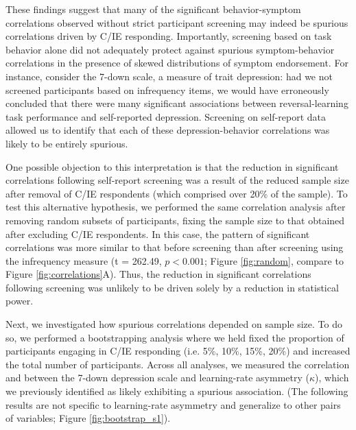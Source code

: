 \documentclass[a4paper,notitlepage,12pt]{article}
\begin{document}
\begin{refsection}[main]
These findings suggest that many of the significant behavior-symptom correlations observed without strict participant screening may indeed be spurious correlations driven by C/IE responding. Importantly, screening based on task behavior alone did not adequately protect against spurious symptom-behavior correlations in the presence of skewed distributions of symptom endorsement. For instance, consider the 7-down scale, a measure of trait depression: had we not screened participants based on infrequency items, we would have erroneously concluded that there were many significant associations between reversal-learning task performance and self-reported depression. Screening on self-report data allowed us to identify that each of these depression-behavior correlations was likely to be entirely spurious.

One possible objection to this interpretation is that the reduction in significant correlations following self-report screening was a result of the reduced sample size after removal of C/IE respondents (which comprised over 20\% of the sample). To test this alternative hypothesis, we performed the same correlation analysis after removing random subsets of participants, fixing the sample size to that obtained after excluding C/IE respondents. In this case, the pattern of significant correlations was more similar to that before screening than after screening using the infrequency measure (t = 262.49, $p < 0.001$; Figure \ref{fig:random}, compare to Figure \ref{fig:correlations}A). Thus, the reduction in significant correlations following screening was unlikely to be driven solely by a reduction in statistical power.

Next, we investigated how spurious correlations depended on sample size. To do so, we performed a bootstrapping analysis where we held fixed the proportion of participants engaging in C/IE responding (i.e. 5\%, 10\%, 15\%, 20\%) and increased the total number of participants. Across all analyses, we measured the correlation and between the 7-down depression scale and learning-rate asymmetry ($\kappa$), which we previously identified as likely exhibiting a spurious association. (The following results are not specific to learning-rate asymmetry and generalize to other pairs of variables; Figure \ref{fig:bootstrap_s1}).  


\end{refsection}
\end{document}
